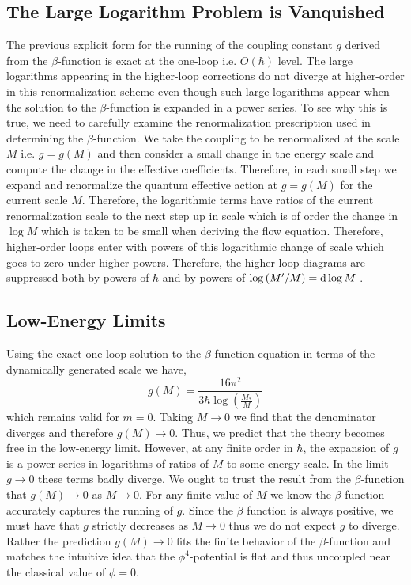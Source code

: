 \documentclass[12pt]{article}
\begin{document}
\subsection{The Large Logarithm Problem is Vanquished}

The previous explicit form for the running of the coupling constant $g$ derived from the $\beta$-function is exact at the one-loop i.e. $O(\hbar)$ level. The large logarithms appearing in the higher-loop corrections do not diverge at higher-order in this renormalization scheme even though such large logarithms appear when the solution to the $\beta$-function is expanded in a power series. To see why this is true, we need to carefully examine the renormalization prescription used in determining the $\beta$-function. We take the coupling to be renormalized at the scale $M$ i.e. $g = g(M)$ and then consider a small change in the energy scale and compute the change in the effective coefficients. Therefore, in each small step we expand and renormalize the quantum effective action at $g = g(M)$ for the current scale $M$. Therefore, the logarithmic terms have ratios of the current renormalization scale to the next step up in scale which is of order the change in $\log{M}$ which is taken to be small when deriving the flow equation. Therefore, higher-order loops enter with powers of this logarithmic change of scale which goes to zero under higher powers. Therefore, the higher-loop diagrams are suppressed both by powers of $\hbar$ and by powers of $\log{(M'/M)} = \mathrm{d}\log{M} \:$. 

\subsection{Low-Energy Limits}

Using the exact one-loop solution to the $\beta$-function equation in terms of the dynamically generated scale we have, 
\[ 
g(M) = \frac{16\pi^2}{3 \hbar \log{\left( \frac{M_*}{M} \right)}} 
\]
which remains valid for $m = 0$. Taking $M \to 0$ we find that the denominator diverges and therefore $g(M) \to 0$. Thus, we predict that the theory becomes free in the low-energy limit. However, at any finite order in $\hbar$, the expansion of $g$ is a power series in logarithms of ratios of $M$ to some energy scale. In the limit $g \to 0$ these terms badly diverge. We ought to trust the result from the $\beta$-function that $g(M) \to 0$ as $M \to 0$. For any finite value of $M$ we know the $\beta$-function accurately captures the running of $g$. Since the $\beta$ function is always positive, we must have that $g$ strictly decreases as $M \to 0$ thus we do not expect $g$ to diverge. Rather the prediction $g(M) \to 0$ fits the finite behavior of the $\beta$-function and matches the intuitive idea that the $\phi^4$-potential is flat and thus uncoupled near the classical value of $\phi = 0$.  
\end{document}
